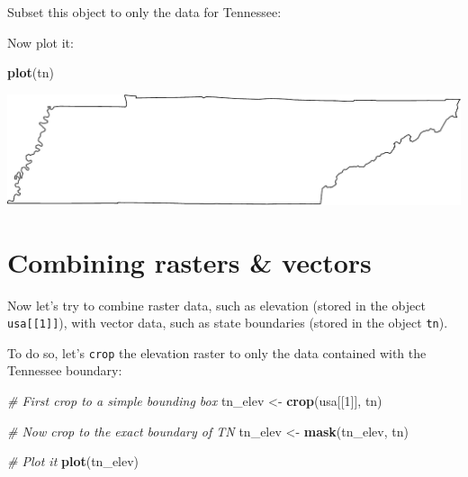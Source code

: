 \documentclass[]{book}
\newenvironment{Shaded}{\begin{snugshade}}{\end{snugshade}}
\newcommand{\CommentTok}[1]{\textcolor[rgb]{0.56,0.35,0.01}{\textit{#1}}}
\newcommand{\DecValTok}[1]{\textcolor[rgb]{0.00,0.00,0.81}{#1}}
\newcommand{\KeywordTok}[1]{\textcolor[rgb]{0.13,0.29,0.53}{\textbf{#1}}}
\newcommand{\NormalTok}[1]{#1}
\newcommand{\OperatorTok}[1]{\textcolor[rgb]{0.81,0.36,0.00}{\textbf{#1}}}
\newcommand{\StringTok}[1]{\textcolor[rgb]{0.31,0.60,0.02}{#1}}
\begin{document}
Subset this object to only the data for Tennessee:

\begin{Shaded}
\end{Shaded}

Now plot it:

\begin{Shaded}
\begin{Highlighting}[]
\KeywordTok{plot}\NormalTok{(tn)}
\end{Highlighting}
\end{Shaded}

\includegraphics{figures/unnamed-chunk-644-1.pdf}

\hypertarget{combining-rasters-vectors}{%
\section*{Combining rasters \& vectors}\label{combining-rasters-vectors}}

Now let's try to combine raster data, such as elevation (stored in the object \texttt{usa{[}{[}1{]}{]}}), with vector data, such as state boundaries (stored in the object \texttt{tn}).

To do so, let's \texttt{crop} the elevation raster to only the data contained with the Tennessee boundary:

\begin{Shaded}
\begin{Highlighting}[]
\CommentTok{# First crop to a simple bounding box}
\NormalTok{tn_elev <-}\StringTok{ }\KeywordTok{crop}\NormalTok{(usa[[}\DecValTok{1}\NormalTok{]], tn)}

\CommentTok{# Now crop to the exact boundary of TN}
\NormalTok{tn_elev <-}\StringTok{ }\KeywordTok{mask}\NormalTok{(tn_elev, tn)}

\CommentTok{# Plot it}
\KeywordTok{plot}\NormalTok{(tn_elev)}
\end{Highlighting}
\end{Shaded}
\end{document}
